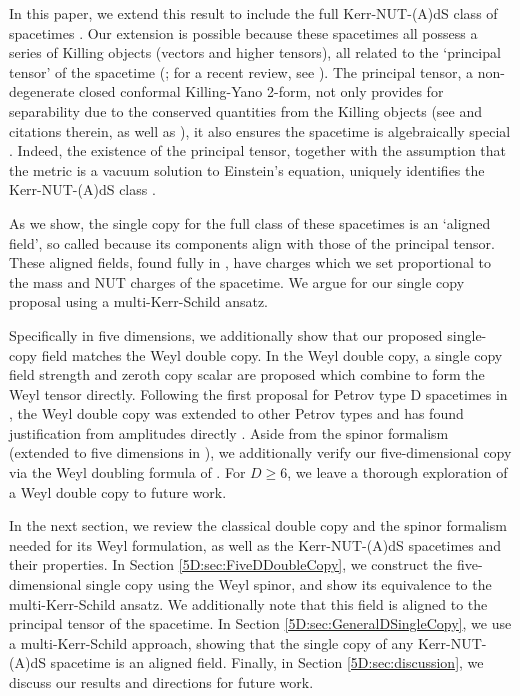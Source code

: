In this paper, we extend this result to include the full Kerr-NUT-(A)dS class of spacetimes \cite{Chen:2006xh}.  Our extension is possible because these spacetimes all possess a series of Killing objects (vectors and higher tensors), all related to the `principal tensor' of the spacetime (\cite{Kubiznak:2006kt}; for a recent review, see \cite{Frolov:2017kze}).  The principal tensor, a non-degenerate closed conformal Killing-Yano 2-form,  not only provides for separability due to the conserved quantities from the Killing objects (see  \cite{Frolov:2017kze} and citations therein, as well as \cite{Krtous:2018bvk}),
it also ensures the spacetime is algebraically special \cite{Mason:2010zzc}.  Indeed, the existence of the principal tensor, together with the assumption that the metric is a vacuum solution to Einstein's equation, uniquely identifies the Kerr-NUT-(A)dS class \cite{Krtous:2008tb}.

As we show, the single copy for the full class of these spacetimes is an `aligned field', so called because its components align with those of the principal tensor.  These aligned fields, found fully in \cite{Krtous:2007xg}, have charges which we set proportional to the mass and NUT charges of the spacetime.  We argue for our single copy proposal using a multi-Kerr-Schild ansatz.

Specifically in five dimensions, we additionally show that our proposed single-copy field matches the Weyl double copy.  In the Weyl double copy, a single copy field strength and zeroth copy scalar are proposed which combine to form the Weyl tensor directly.  Following the first proposal for Petrov type D spacetimes in \cite{Luna:2018dpt}, the Weyl double copy was extended to other Petrov types \cite{Godazgar:2020zbv} and has found justification from amplitudes directly \cite{Elor:2020nqe,Farnsworth:2021wvs,White:2020sfn,Chacon:2021wbr,Chacon:2021lox,Han:2022ubu,Easson:2021asd,Luna:2022dxo,Monteiro:2020plf}.  Aside from the spinor formalism (extended to five dimensions in \cite{Monteiro:2018xev}), we additionally verify our five-dimensional copy via the Weyl doubling formula of \cite{Alawadhi:2020jrv}.  For $D\geq 6$, we leave a thorough exploration of a Weyl double copy to future work.

In the next section, we review the classical double copy and the spinor formalism needed for its Weyl formulation, as well as the  Kerr-NUT-(A)dS spacetimes and their properties. In Section \ref{5D:sec:FiveDDoubleCopy}, we construct the five-dimensional single copy using the Weyl spinor, and show its equivalence to the multi-Kerr-Schild ansatz.  We additionally note that this field is aligned to the principal tensor of the spacetime.  In Section \ref{5D:sec:GeneralDSingleCopy}, we use a multi-Kerr-Schild approach, showing that the single copy of any Kerr-NUT-(A)dS spacetime is an aligned field.  Finally, in Section \ref{5D:sec:discussion}, we discuss our results and directions for future work.  

